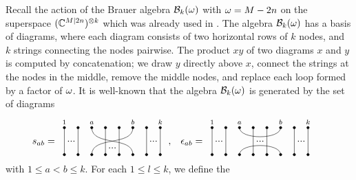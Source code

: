 \documentclass[12pt]{article}
\begin{document}
Recall the action
of the Brauer algebra ${\mathcal B}_k(\omega)$ with $\omega=M-2n$
on the superspace $(\mathbb{C}^{M|2n})^{\otimes k}$
which was already used in \cite{mn:ss}. The algebra ${\mathcal B}_k(\omega)$ has a basis of diagrams, where each diagram consists of two horizontal rows of $k$ nodes, and $k$ strings connecting the nodes pairwise. The product $xy$ of two diagrams $x$ and $y$ is computed by concatenation; we draw $y$ directly above $x$, connect the strings at the nodes in the middle, remove the middle nodes, 
and replace each loop formed by a factor of $\omega$. It is well-known that
the algebra ${\mathcal B}_k(\omega)$ is generated by the set of diagrams
\begin{align}
    s_{ab} &= \, \begin{tikzpicture}[baseline={([yshift=4.5mm]current bounding box.south)},scale=0.5]
{
\foreach \x in {0,...,7}{
\filldraw (\x,0) circle (0.09);
\filldraw (\x,2) circle (0.09);
}
\draw (0,0)--(0,2);
\draw (1,0)--(1,2);
\draw (3,0)--(3,2);
\draw (4,0)--(4,2);
\draw (6,0)--(6,2);
\draw (7,0)--(7,2);
\draw (2,0) to[out=90,in=270](5,2);
\draw (5,0) to[out=90,in=270](2,2);
%
\foreach \y in {0.2,0,-0.2}{
\node at (0.5+\y,1) {.};
}
\foreach \y in {0.2,0,-0.2}{
\node at (3.5+\y,0.5) {.};
}
\foreach \y in {0.2,0,-0.2}{
\node at (6.5+\y,1) {.};
}
\draw (0,2) node[font=\scriptsize,anchor=south]{$1$};
\draw (2,2) node[font=\scriptsize,anchor=south]{$a$};
\draw (5,2) node[font=\scriptsize,anchor=south]{$b$};
\draw (7,2) node[font=\scriptsize,anchor=south]{$k$};
}
\end{tikzpicture}\; ,
    &\epsilon_{ab} &= \, \begin{tikzpicture}[baseline={([yshift=4.5mm]current bounding box.south)},scale=0.5]
{
\foreach \x in {0,...,7}{
\filldraw (\x,0) circle (0.09);
\filldraw (\x,2) circle (0.09);
}
\draw (0,0)--(0,2);
\draw (1,0)--(1,2);
\draw (3,0)--(3,2);
\draw (4,0)--(4,2);
\draw (6,0)--(6,2);
\draw (7,0)--(7,2);
\draw (2,0) ..controls (2,0.9) and (5,0.9).. (5,0);
\draw (2,2) ..controls (2,1.1) and (5,1.1).. (5,2);
%
\foreach \y in {0.2,0,-0.2}{
\node at (0.5+\y,1) {.};
}
\foreach \y in {0.2,0,-0.2}{
\node at (3.5+\y,1) {.};
}
\foreach \y in {0.2,0,-0.2}{
\node at (6.5+\y,1) {.};
}
\draw (0,2) node[font=\scriptsize,anchor=south]{$1$};
\draw (2,2) node[font=\scriptsize,anchor=south]{$a$};
\draw (5,2) node[font=\scriptsize,anchor=south]{$b$};
\draw (7,2) node[font=\scriptsize,anchor=south]{$k$};
}
\end{tikzpicture}\;
\non
\end{align}
with $1\leqslant a<b\leqslant k$.
For each $1 \leqslant l \leqslant k$, we define the
\end{document}
